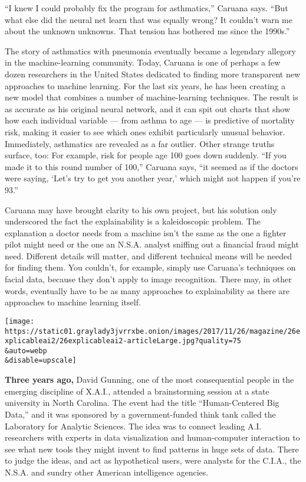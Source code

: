 ``I knew I could probably fix the program for asthmatics,'' Caruana
says. ``But what else did the neural net learn that was equally wrong?
It couldn't warn me about the unknown unknowns. That tension has
bothered me since the 1990s.''

The story of asthmatics with pneumonia eventually became a legendary
allegory in the machine-learning community. Today, Caruana is one of
perhaps a few dozen researchers in the United States dedicated to
finding more transparent new approaches to machine learning. For the
last six years, he has been creating a new model that combines a number
of machine-learning techniques. The result is as accurate as his
original neural network, and it can spit out charts that show how each
individual variable --- from asthma to age --- is predictive of
mortality risk, making it easier to see which ones exhibit particularly
unusual behavior. Immediately, asthmatics are revealed as a far outlier.
Other strange truths surface, too: For example, risk for people age 100
goes down suddenly. ``If you made it to this round number of 100,''
Caruana says, ``it seemed as if the doctors were saying, `Let's try to
get you another year,' which might not happen if you're 93.''

Caruana may have brought clarity to his own project, but his solution
only underscored the fact the explainability is a kaleidoscopic problem.
The explanation a doctor needs from a machine isn't the same as the one
a fighter pilot might need or the one an N.S.A. analyst sniffing out a
financial fraud might need. Different details will matter, and different
technical means will be needed for finding them. You couldn't, for
example, simply use Caruana's techniques on facial data, because they
don't apply to image recognition. There may, in other words, eventually
have to be as many approaches to explainability as there are approaches
to machine learning itself.

\texttt{[image: https://static01.graylady3jvrrxbe.onion/images/2017/11/26/magazine/26explicableai2/26explicableai2-articleLarge.jpg?quality=75\\\&auto=webp\\\&disable=upscale]}

\textbf{Three years ago,} David Gunning, one of the most consequential
people in the emerging discipline of X.A.I., attended a brainstorming
session at a state university in North Carolina. The event had the title
``Human-Centered Big Data,'' and it was sponsored by a government-funded
think tank called the Laboratory for Analytic Sciences. The idea was to
connect leading A.I. researchers with experts in data visualization and
human-computer interaction to see what new tools they might invent to
find patterns in huge sets of data. There to judge the ideas, and act as
hypothetical users, were analysts for the C.I.A., the N.S.A. and sundry
other American intelligence agencies.

